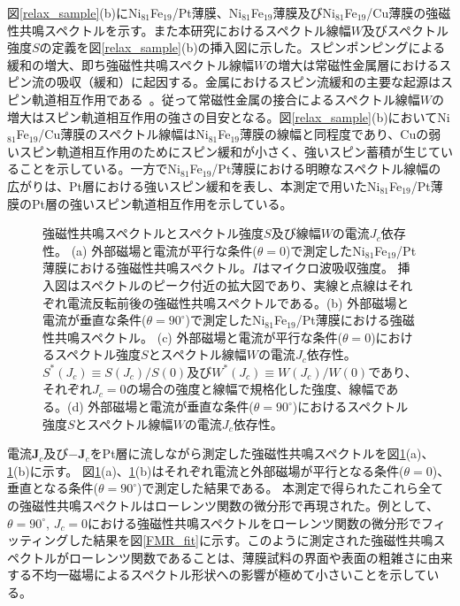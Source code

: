 図\ref{relax_sample}(b)にNi$_{81}$Fe$_{19}$/Pt薄膜、Ni$_{81}$Fe$_{19}$薄膜及びNi$_{81}$Fe$_{19}$/Cu薄膜の強磁性共鳴スペクトルを示す。また本研究におけるスペクトル線幅$W$及びスペクトル強度$S$の定義を図\ref{relax_sample}(b)の挿入図に示した。スピンポンピングによる緩和の増大、即ち強磁性共鳴スペクトル線幅$W$の増大は常磁性金属層におけるスピン流の吸収（緩和）に起因する。金属におけるスピン流緩和の主要な起源はスピン軌道相互作用である~\cite{Mizukami}。従って常磁性金属の接合によるスペクトル線幅$W$の増大はスピン軌道相互作用の強さの目安となる。図\ref{relax_sample}(b)においてNi$_{81}$Fe$_{19}$/Cu薄膜のスペクトル線幅はNi$_{81}$Fe$_{19}$薄膜の線幅と同程度であり、Cuの弱いスピン軌道相互作用のためにスピン緩和が小さく、強いスピン蓄積が生じていることを示している。一方でNi$_{81}$Fe$_{19}$/Pt薄膜における明瞭なスペクトル線幅の広がりは、Pt層における強いスピン緩和を表し、本測定で用いたNi$_{81}$Fe$_{19}$/Pt薄膜のPt層の強いスピン軌道相互作用を示している。







\begin{figure}[htbp]
 \begin{center}
 \caption{強磁性共鳴スペクトルとスペクトル強度$S$及び線幅$W$の電流$J_c$依存性。
(a) 外部磁場と電流が平行な条件($\theta=0$)で測定したNi$_{81}$Fe$_{19}$/Pt薄膜における強磁性共鳴スペクトル。$I$はマイクロ波吸収強度。
挿入図はスペクトルのピーク付近の拡大図であり、実線と点線はそれぞれ電流反転前後の強磁性共鳴スペクトルである。(b) 外部磁場と電流が垂直な条件($\theta=90^\circ$)で測定したNi$_{81}$Fe$_{19}$/Pt薄膜における強磁性共鳴スペクトル。
(c) 外部磁場と電流が平行な条件($\theta=0$)におけるスペクトル強度$S$とスペクトル線幅$W$の電流$J_c$依存性。$S^*(J_c)\equiv S(J_c)/S(0)$及び$W^*(J_c)\equiv W(J_c)/W(0)$であり、
それぞれ$J_c=0$の場合の強度と線幅で規格化した強度、線幅である。(d) 外部磁場と電流が垂直な条件($\theta=90^\circ$)におけるスペクトル強度$S$とスペクトル線幅$W$の電流$J_c$依存性。
}
 \label{FMR_90deg} 
\end{center}
\end{figure}



電流$\bm{J}_c$及び$-\bm{J}_c$をPt層に流しながら測定した強磁性共鳴スペクトルを図\ref{FMR_90deg}(a)、\ref{FMR_90deg}(b)に示す。
図\ref{FMR_90deg}(a)、\ref{FMR_90deg}(b)はそれぞれ電流と外部磁場が平行となる条件($\theta=0$)、垂直となる条件($\theta=90^\circ$)で測定した結果である。
本測定で得られたこれら全ての強磁性共鳴スペクトルはローレンツ関数の微分形で再現された。例として、$\theta=90^\circ$, $J_c=0$における強磁性共鳴スペクトルをローレンツ関数の微分形でフィッティングした結果を図\ref{FMR_fit}に示す。このように測定された強磁性共鳴スペクトルがローレンツ関数であることは、薄膜試料の界面や表面の粗雑さに由来する不均一磁場によるスペクトル形状への影響が極めて小さいことを示している。


